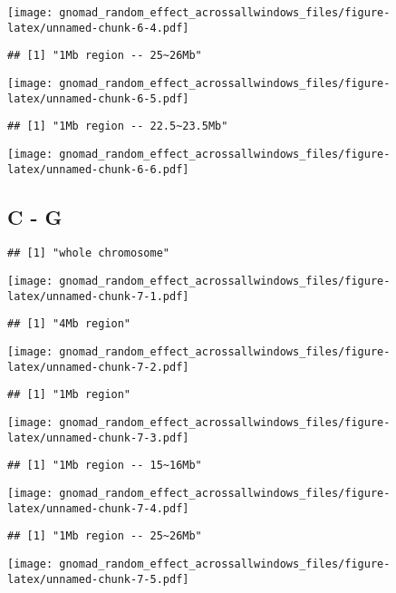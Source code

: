\documentclass[
]{article}
\begin{document}
\texttt{[image: gnomad\_random\_effect\_acrossallwindows\_files/figure-latex/unnamed-chunk-6-4.pdf]}

\begin{verbatim}
## [1] "1Mb region -- 25~26Mb"
\end{verbatim}

\texttt{[image: gnomad\_random\_effect\_acrossallwindows\_files/figure-latex/unnamed-chunk-6-5.pdf]}

\begin{verbatim}
## [1] "1Mb region -- 22.5~23.5Mb"
\end{verbatim}

\texttt{[image: gnomad\_random\_effect\_acrossallwindows\_files/figure-latex/unnamed-chunk-6-6.pdf]}

\hypertarget{c---g}{%
\subsection{C - G}\label{c---g}}

\begin{verbatim}
## [1] "whole chromosome"
\end{verbatim}

\texttt{[image: gnomad\_random\_effect\_acrossallwindows\_files/figure-latex/unnamed-chunk-7-1.pdf]}

\begin{verbatim}
## [1] "4Mb region"
\end{verbatim}

\texttt{[image: gnomad\_random\_effect\_acrossallwindows\_files/figure-latex/unnamed-chunk-7-2.pdf]}

\begin{verbatim}
## [1] "1Mb region"
\end{verbatim}

\texttt{[image: gnomad\_random\_effect\_acrossallwindows\_files/figure-latex/unnamed-chunk-7-3.pdf]}

\begin{verbatim}
## [1] "1Mb region -- 15~16Mb"
\end{verbatim}

\texttt{[image: gnomad\_random\_effect\_acrossallwindows\_files/figure-latex/unnamed-chunk-7-4.pdf]}

\begin{verbatim}
## [1] "1Mb region -- 25~26Mb"
\end{verbatim}

\texttt{[image: gnomad\_random\_effect\_acrossallwindows\_files/figure-latex/unnamed-chunk-7-5.pdf]}
\end{document}

